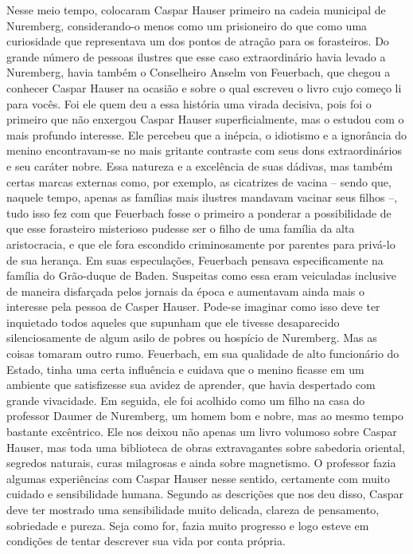Nesse meio tempo, colocaram Caspar Hauser primeiro na cadeia municipal
de Nuremberg, considerando-o menos como um prisioneiro do que como uma
curiosidade que representava um dos pontos de atração para os
forasteiros. Do grande número de pessoas ilustres que esse caso
extraordinário havia levado a Nuremberg, havia também o Conselheiro
Anselm von Feuerbach, que chegou a conhecer Caspar Hauser na ocasião e
sobre o qual escreveu o livro cujo começo li para vocês. Foi ele quem
deu a essa história uma virada decisiva, pois foi o primeiro que não
enxergou Caspar Hauser superficialmente, mas o estudou com o mais
profundo interesse. Ele percebeu que a inépcia, o idiotismo e a
ignorância do menino encontravam-se no mais gritante contraste com seus
dons extraordinários e seu caráter nobre. Essa natureza e a excelência
de suas dádivas, mas também certas marcas externas como, por exemplo, as
cicatrizes de vacina -- sendo que, naquele tempo, apenas as famílias
mais ilustres mandavam vacinar seus filhos --, tudo isso fez com que
Feuerbach fosse o primeiro a ponderar a possibilidade de que esse
forasteiro misterioso pudesse ser o filho de uma família da alta
aristocracia, e que ele fora escondido criminosamente por parentes para
privá-lo de sua herança. Em suas especulações, Feuerbach pensava
especificamente na família do Grão-duque de Baden. Suspeitas como essa eram veiculadas inclusive de maneira disfarçada pelos jornais da época e aumentavam ainda mais o interesse pela pessoa de Casper Hauser. Pode-se imaginar como isso deve ter inquietado todos aqueles que supunham que ele tivesse
desaparecido silenciosamente de algum asilo de pobres ou hospício de
Nuremberg. Mas as coisas tomaram outro rumo. Feuerbach, em sua qualidade
de alto funcionário do Estado, tinha uma certa influência e cuidava que
o menino ficasse em um ambiente que satisfizesse sua avidez de aprender,
que havia despertado com grande vivacidade. Em seguida, ele foi acolhido
como um filho na casa do professor Daumer de Nuremberg, um homem bom e
nobre, mas ao mesmo tempo bastante excêntrico. Ele nos deixou não apenas
um livro volumoso sobre Caspar Hauser, mas toda uma biblioteca de obras
extravagantes sobre sabedoria oriental, segredos naturais, curas
milagrosas e ainda sobre magnetismo. O professor fazia algumas
experiências com Caspar Hauser nesse sentido, certamente com muito
cuidado e sensibilidade humana. Segundo as descrições que nos deu disso,
Caspar deve ter mostrado uma sensibilidade muito delicada, clareza de
pensamento, sobriedade e pureza. Seja como for, fazia muito progresso e
logo esteve em condições de tentar descrever sua vida por conta própria.
